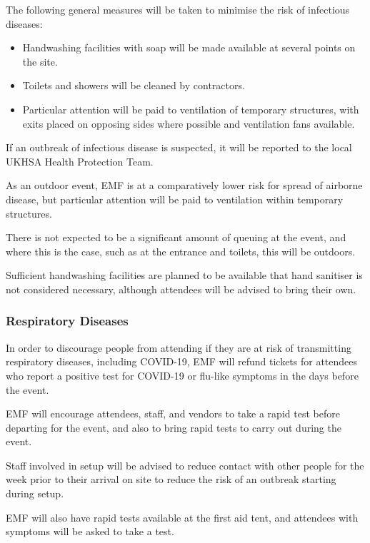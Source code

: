 The following general measures will be taken to minimise the risk of infectious diseases:
\begin{itemize}
    \tightlist
    \item Handwashing facilities with soap will be made available at several points on the site.
    \item Toilets and showers will be cleaned by contractors.
    \item Particular attention will be paid to ventilation of temporary structures, with
          exits placed on opposing sides where possible and ventilation fans available.
\end{itemize}

If an outbreak of infectious disease is suspected, it will be reported to the local
UKHSA Health Protection Team.

As an outdoor event, EMF is at a comparatively lower risk for spread of airborne disease,
but particular attention will be paid to ventilation within temporary structures.

There is not expected to be a significant amount of queuing at the event, and where this is
the case, such as at the entrance and toilets, this will be outdoors.

Sufficient handwashing facilities are planned to be available that hand sanitiser is not
considered necessary, although attendees will be advised to bring their own.

\subsubsection{Respiratory Diseases}

In order to discourage people from attending if they are at risk of transmitting respiratory
diseases, including COVID-19, EMF will refund tickets for attendees who report a
positive test for COVID-19 or flu-like symptoms in the days before the event.

EMF will encourage attendees, staff, and vendors to take a rapid test before
departing for the event, and also to bring rapid tests to carry out during the event.

Staff involved in setup will be advised to reduce contact with other people for the week prior to
their arrival on site to reduce the risk of an outbreak starting during setup.

EMF will also have rapid tests available at the first aid tent, and attendees with symptoms
will be asked to take a test.

